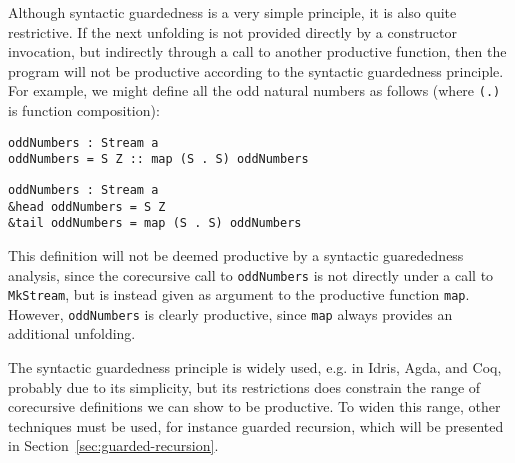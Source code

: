 Although syntactic guardedness is a very simple principle, it is also quite
restrictive. If the next unfolding is not provided directly by a
constructor invocation, but indirectly through a call to another productive
function, then the program will not be productive according to the syntactic
guardedness principle. For example, we might define all the odd natural numbers
as follows (where \texttt{(.)} is function composition):
\begin{lstlisting}[mathescape,title=\idrisBlock]
oddNumbers : Stream a
oddNumbers = S Z :: map (S . S) oddNumbers
\end{lstlisting}
\begin{lstlisting}[mathescape,title=\idrisBlock]
oddNumbers : Stream a
&head oddNumbers = S Z
&tail oddNumbers = map (S . S) oddNumbers
\end{lstlisting}
This definition will not be deemed productive by a syntactic guarededness
analysis, since the corecursive call to \texttt{oddNumbers} is not directly
under a call to \texttt{MkStream}, but is instead given as argument to the
productive function \texttt{map}. However, \texttt{oddNumbers} is clearly
productive, since \texttt{map} always provides an additional unfolding. 

The syntactic guardedness principle is widely used, e.g. in Idris, Agda, and
Coq, probably due to its simplicity, but its restrictions does constrain the range
of corecursive definitions we can show to be productive. To widen this range,
other techniques must be used, for instance guarded recursion, which will be
presented in Section~\ref{sec:guarded-recursion}.



